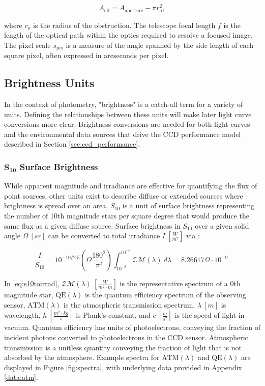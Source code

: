 \begin{equation}
  A_\mathrm{eff} = A_\mathrm{aperture} - \pi r_{o}^2,
\end{equation}

where $r_o$ is the radius of the obstruction. The telescope focal length $f$ is the length of the optical path within the optics required to resolve a focused image. The pixel scale $s_\mathrm{pix}$ is a measure of the angle spanned by the side length of each square pixel, often expressed in arcseconds per pixel. 

\subsection{Brightness Units}

In the context of photometry, "brightness" is a catch-all term for a variety of units. Defining the relationships between these units will make later light curve conversions more clear. Brightness conversions are needed for both light curves and the environmental data sources that drive the CCD performance model described in Section \ref{sec:ccd_performance}.

\subsubsection{$\mathbf{S_{10}}$ Surface Brightness}

While apparent magnitude and irradiance are effective for quantifying the flux of point sources, other units exist
to describe diffuse or extended sources where brightness is spread over an
area. $S_{10}$ is a unit of surface brightness representing the number of 10th magnitude stars per square degree that would produce the same flux as a given diffuse source.
Surface brightness in $S_{10}$ over a given solid angle $\Omega \: \left[ sr \right]$ can be converted to total irradiance $I \: \left[ \frac{W}{m^2} \right]$ via \cite{krag2003}:

\begin{equation} \label{eq:s10toirrad}
 \frac{I}{S_{10}} = 10^{-10/2.5} \left( \Omega \frac{180^2}{\pi^2} \right)
  \int_{10^{-8}}^{10^{-6}}{ \mathcal{ZM}(\lambda) \: d\lambda} = 8.26617 \Omega \cdot 10^{-9}.
\end{equation}

In \ref{eq:s10toirrad}, $\mathcal{ZM}(\lambda) \: \left[ \frac{W}{m^2 \cdot m} \right]$ is the
representative spectrum of a 0th magnitude star, $\textrm{QE}(\lambda)$ is the quantum efficiency
spectrum of the observing sensor, $\textrm{ATM}(\lambda)$ is the atmospheric transmission spectrum, $\lambda \: [m]$ is wavelength, $h \: \left[
\frac{m^2 \cdot kg}{s} \right]$ is Plank's constant, and $c \: \left[ \frac{m}{s^2} \right]$ is the
speed of light in vacuum. Quantum efficiency has units of photoelectrons, conveying the fraction of incident photons converted to photoelectrons in the CCD sensor. Atmospheric transmission is a unitless quantity conveying the fraction of light that is not absorbed by the atmosphere. Example spectra for $\textrm{ATM}(\lambda)$ and $\textrm{QE}(\lambda)$ are displayed in Figure \ref{fig:spectra}, with underlying data provided in Appendix \ref{data:atm}.

